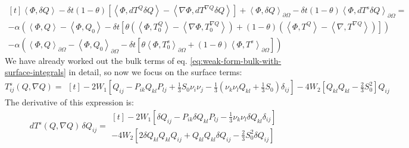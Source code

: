\documentclass[reqno]{article}
\begin{document}
\begin{equation} \label{eq:weak-form-bulk-with-surface-integrals}
\begin{multlined}[t]
    \left<\Phi, \delta Q\right> 
    - \delta t \left(1 - \theta \right) \left[
        \left<\Phi, dT^Q \delta Q\right> 
        - \left<\nabla \Phi, dT^{\nabla Q} \delta Q \right>
    \right] 
    + \left<\Phi, \delta Q\right>_{\partial \Omega}
    - \delta t \left(1 - \theta \right) \left< \Phi, dT^s \delta Q \right>_{\partial \Omega}
    = \\
    - \alpha \left( 
        \left<\Phi, Q\right> - \left<\Phi, Q_0\right> - \delta t \left[ 
            \theta \left(\left<\Phi, T_0^Q\right> - \left<\nabla \Phi, T_0^{\nabla Q} \right> \right)
            + \left(1 - \theta \right) \left( \left<\Phi, T^Q\right> - \left<\nabla, T^{\nabla Q} \right> \right)
        \right]
    \right) \\
    -
    \alpha \left(
        \left<\Phi, Q\right>_{\partial \Omega} 
            - \left< \Phi, Q_0 \right>_{\partial \Omega} 
            - \delta t \left[ 
                \theta \left<\Phi, T_0^s\right>_{\partial \Omega} 
                + \left(1 - \theta\right) \left< \Phi, T^s \right>_{\partial \Omega} 
            \right] 
    \right)
\end{multlined}
\end{equation}
We have already worked out the bulk terms of eq. \eqref{eq:weak-form-bulk-with-surface-integrals} in detail, so now we focus on the surface terms:
\begin{equation}
    T^s_{ij}(Q, \nabla Q)
    =
    \begin{multlined}[t]
        -2 W_1 \left[
            Q_{ij} 
            - P_{ik} Q_{kl} P_{lj} 
            + \frac13 S_0 \nu_i \nu_j 
            - \frac13 \left( \nu_k \nu_l Q_{kl} + \frac13 S_0 \right) \delta_{ij}
        \right] 
        - 4 W_2 \left[ 
            Q_{kl} Q_{kl}
            - \frac23 S_0^2
        \right] Q_{ij}
    \end{multlined}
\end{equation}
The derivative of this expression is:
\begin{equation}
    dT^s(Q, \nabla Q) \, \delta Q_{ij}
    =
    \begin{multlined}[t]
        -2 W_1 \left[
            \delta Q_{ij} 
            - P_{ik} \delta Q_{kl} P_{lj} 
            - \frac13 \nu_k \nu_l \delta Q_{kl} \delta_{ij}
        \right] \\
        - 4 W_2 \left[ 
            2 \delta Q_{kl} Q_{kl} Q_{ij}
            + Q_{kl} Q_{kl} \delta Q_{ij}
            - \frac23 S_0^2 \delta Q_{ij}
        \right] 
    \end{multlined}
\end{equation}
\end{document}
